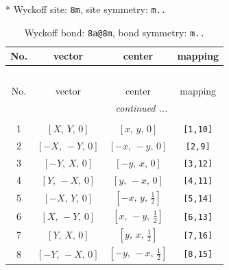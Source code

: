 \documentclass[fleqn,8pt]{jsarticle}
\begin{document}
* Wyckoff site: {\tt 8m}, site symmetry: {\tt m..}
\renewcommand{\arraystretch}{1.2}
\begin{longtable}{cccc}
\caption{Wyckoff bond: {\tt 8a@8m}, bond symmetry: {\tt m..}}
 \\
 \hline \hline
No. & vector & center & mapping \\ \hline \endfirsthead

\multicolumn{3}{l}{\tablename\ \thetable{}} \\
 \hline \hline
No. & vector & center & mapping \\ \hline \endhead

 \hline \hline
\multicolumn{3}{r}{\footnotesize\it continued ...} \\ \endfoot

 \hline \hline
\multicolumn{3}{r}{} \\ \endlastfoot

1 & $\left[ X,\, Y,\, 0 \right]$ & $\left[ x,\, y,\, 0 \right]$ & {\tt [1,10]} \\ \hline
2 & $\left[ - X,\, - Y,\, 0 \right]$ & $\left[ - x,\, - y,\, 0 \right]$ & {\tt [2,9]} \\ \hline
3 & $\left[ - Y,\, X,\, 0 \right]$ & $\left[ - y,\, x,\, 0 \right]$ & {\tt [3,12]} \\ \hline
4 & $\left[ Y,\, - X,\, 0 \right]$ & $\left[ y,\, - x,\, 0 \right]$ & {\tt [4,11]} \\ \hline
5 & $\left[ - X,\, Y,\, 0 \right]$ & $\left[ - x,\, y,\, \frac{1}{2} \right]$ & {\tt [5,14]} \\ \hline
6 & $\left[ X,\, - Y,\, 0 \right]$ & $\left[ x,\, - y,\, \frac{1}{2} \right]$ & {\tt [6,13]} \\ \hline
7 & $\left[ Y,\, X,\, 0 \right]$ & $\left[ y,\, x,\, \frac{1}{2} \right]$ & {\tt [7,16]} \\ \hline
8 & $\left[ - Y,\, - X,\, 0 \right]$ & $\left[ - y,\, - x,\, \frac{1}{2} \right]$ & {\tt [8,15]} \\
\end{longtable}
\renewcommand{\arraystretch}{1.2}
\end{document}
